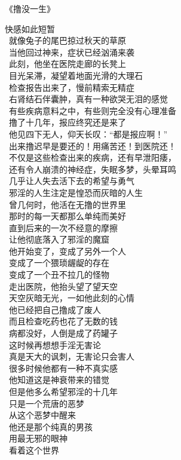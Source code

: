 \begin{center}
    《撸没一生》\it
    \begin{multicols}{2}
        快感如此短暂 \\\ 就像兔子的尾巴掠过秋天的草原 \\\ 当他回过神来，症状已经汹涌来袭 \\\ 此刻，他坐在医院走廊的长凳上 \\\ 目光呆滞，凝望着地面光滑的大理石 \\\ 检查报告出来了，慢前精索无精症 \\\ 右肾结石伴囊肿，真有一种欲哭无泪的感觉 \\\ 有些疾病意料之中，有些则完全没有心理准备 \\\ 撸了十几年，报应终究还是来了 \\\ 他见四下无人，仰天长叹：“都是报应啊！” \\\ 出来撸迟早是要还的！用痛苦还！到医院还！ \\\ 不仅是这些检查出来的疾病，还有早泄阳痿， \\\ 还有令人崩溃的神经症，失眠多梦，头晕耳鸣 \\\ 几乎让人失去活下去的希望与勇气 \\\ 邪淫的人生注定是惶恐而灰暗的人生 \\\ 曾几何时，他活在无撸的世界里 \\\ 那时的每一天都那么单纯而美好 \\\ 直到后来的一次不经意的摩擦 \\\ 让他彻底落入了邪淫的魔窟 \\\ 他开始变了，变成了另外一个人 \\\ 变成了一个猥琐龌龊的存在 \\\ 变成了一个丑不拉几的怪物 \\\ 走出医院，他抬头望了望天空 \\\ 天空灰暗无光，一如他此刻的心情 \\\ 他已经把自己撸成了废人 \\\ 而且检查吃药也花了无数的钱 \\\ 病都没好，人倒是成了药罐子 \\\ 这时候再想想手淫无害论 \\\ 真是天大的讽刺，无害论只会害人 \\\ 很多时候他都有一种不真实感 \\\ 他知道这是神衰带来的错觉 \\\ 但是他多么希望邪淫的十几年 \\\ 只是一个荒唐的恶梦 \\\ 从这个恶梦中醒来 \\\ 他还是那个纯真的男孩 \\\ 用最无邪的眼神 \\\ 看着这个世界
    \end{multicols}
\end{center}

